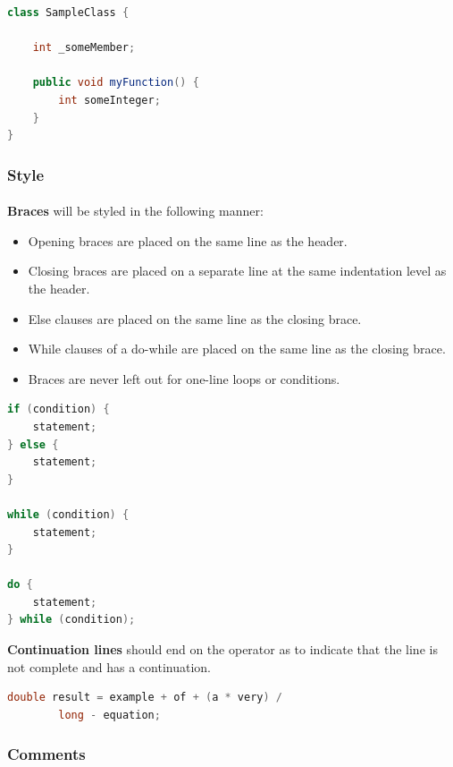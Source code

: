 \documentclass{article}
\begin{document}
    \begin{lstlisting}[language=java]
class SampleClass {

    int _someMember;

    public void myFunction() {
        int someInteger;
    }
}
    \end{lstlisting}

    \subsubsection{Style}
    \label{sec:java-st}

    \paragraph{}
    \textbf{Braces} will be styled in the following manner:
    \begin{itemize}
        \item Opening braces are placed on the same line as the header.
        \item Closing braces are placed on a separate line at the same
                indentation level as the header.
        \item Else clauses are placed on the same line as the closing brace.
        \item While clauses of a do-while are placed on the same line as the
                closing brace.
        \item Braces are never left out for one-line loops or conditions.
    \end{itemize}

    \begin{lstlisting}[language=Java]
if (condition) {
    statement;
} else {
    statement;
}

while (condition) {
    statement;
}

do {
    statement;
} while (condition);
    \end{lstlisting}

    \textbf{Continuation lines} should end on the operator as to indicate that
    the line is not complete and has a continuation.

    \begin{lstlisting}[language=Java]
double result = example + of + (a * very) / 
        long - equation;
    \end{lstlisting}

    \subsubsection{Comments}
    \label{sec:java-com}
\end{document}
